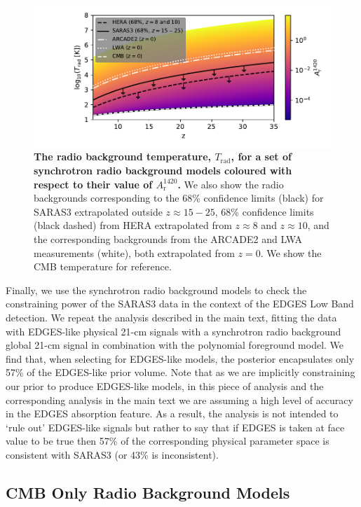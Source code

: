 \begin{figure}[ht!]
    \centering
    \includegraphics{saras3/figs/FigureS4.pdf}
    \caption{\textbf{The radio background temperature, $T_\mathrm{rad}$, for a set of synchrotron radio background models coloured with respect to their value of $A_{\mathrm{r}}^{1420}$.} We also show the radio backgrounds corresponding to the 68\% confidence limits (black) for SARAS3 extrapolated outside $z\approx 15 - 25$, 68\% confidence limits (black dashed) from HERA extrapolated from $z\approx8$ and $z\approx10$, and the corresponding backgrounds from the ARCADE2 and LWA measurements (white), both extrapolated from $z=0$. We show the CMB temperature for reference.}
    \label{fig:srb_trad}
\end{figure}

Finally, we use the synchrotron radio background models to check the constraining power of the SARAS3 data in the context of the EDGES Low Band detection. We repeat the analysis described in the main text, fitting the data with EDGES-like physical 21-cm signals with a synchrotron radio background global 21-cm signal in combination with the polynomial foreground model. We find that, when selecting for EDGES-like models, the posterior encapsulates only 57\% of the EDGES-like prior volume. Note that as we are implicitly constraining our prior to produce EDGES-like models, in this piece of analysis and the corresponding analysis in the main text we are assuming a high level of accuracy in the EDGES absorption feature. As a result, the analysis is not intended to `rule out' EDGES-like signals but rather to say that if EDGES is taken at face value to be true then 57\% of the corresponding physical parameter space is consistent with SARAS3 (or 43\% is inconsistent).

\subsection{CMB Only Radio Background Models} \label{app:results_sta}

